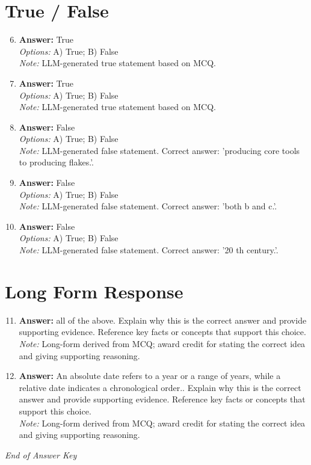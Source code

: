 \documentclass[12pt]{article}
\begin{document}
\section*{True / False}
\begin{enumerate}[label=\arabic*.]
\setcounter{enumi}{5}
\item \textbf{Answer:} True
\\ \textit{Options:} A) True; B) False
\\ \textit{Note:} LLM-generated true statement based on MCQ.
\item \textbf{Answer:} True
\\ \textit{Options:} A) True; B) False
\\ \textit{Note:} LLM-generated true statement based on MCQ.
\item \textbf{Answer:} False
\\ \textit{Options:} A) True; B) False
\\ \textit{Note:} LLM-generated false statement. Correct answer: 'producing core tools to producing flakes.'.
\item \textbf{Answer:} False
\\ \textit{Options:} A) True; B) False
\\ \textit{Note:} LLM-generated false statement. Correct answer: 'both b and c.'.
\item \textbf{Answer:} False
\\ \textit{Options:} A) True; B) False
\\ \textit{Note:} LLM-generated false statement. Correct answer: '20 th century.'.
\end{enumerate}

\section*{Long Form Response}
\begin{enumerate}[label=\arabic*.]
\setcounter{enumi}{10}
\item \textbf{Answer:} all of the above. Explain why this is the correct answer and provide supporting evidence. Reference key facts or concepts that support this choice.
\\ \textit{Note:} Long-form derived from MCQ; award credit for stating the correct idea and giving supporting reasoning.
\item \textbf{Answer:} An absolute date refers to a year or a range of years, while a relative date indicates a chronological order.. Explain why this is the correct answer and provide supporting evidence. Reference key facts or concepts that support this choice.
\\ \textit{Note:} Long-form derived from MCQ; award credit for stating the correct idea and giving supporting reasoning.
\end{enumerate}

\vfill
\noindent\textit{End of Answer Key}
\end{document}
